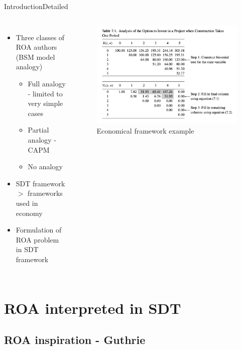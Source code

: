 \documentclass[us]{beamer}
\begin{document}
\begin{frame}{Introduction}{Detailed}

\begin{columns}
	\begin{itemize}
		\item {Three classes of ROA authors (BSM model analogy)}
		\begin{itemize}
			\item{Full analogy - limited to very simple cases}
			\item{Partial analogy - CAPM}
			\item {No analogy }
		\end{itemize}
		\item {SDT framework $>$ frameworks used in economy}
		\item {Formulation of ROA problem in SDT framework}
	\end{itemize}	
	\begin{figure}
		\includegraphics[scale=0.35]{figures/Guthrie.png}
		\caption{Economical framework example \cite{Gut:09}}
	\end{figure}
\end{columns}	

\end{frame}




\section{ROA interpreted in SDT}

\subsection{ROA inspiration - Guthrie}
\end{document}
